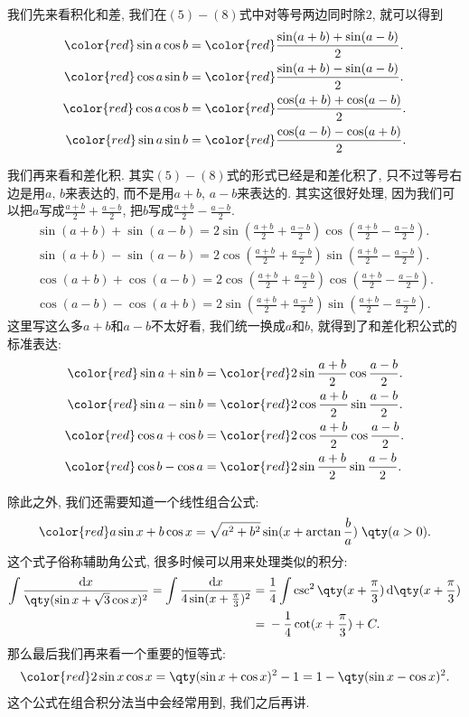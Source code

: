 \documentclass{ctexbook}
\newcommand*{\dif}{\mathop{}\!\mathrm{d}}
\begin{document}
{我们先来看积化和差, 我们在$(5)-(8)$式中对等号两边同时除$2$, 就可以得到
\begin{align*}\color{red}
\sin{a}\cos{b}={}&\color{red}\frac{\sin(a+b)+\sin(a-b)}{2}.\\\color{red}
\cos{a}\sin{b}={}&\color{red}\frac{\sin(a+b)-\sin(a-b)}{2}.\\\color{red}
\cos{a}\cos{b}={}&\color{red}\frac{\cos(a+b)+\cos(a-b)}{2}.\\\color{red}
\sin{a}\sin{b}={}&\color{red}\frac{\cos(a-b)-\cos(a+b)}{2}
.\end{align*}\par
我们再来看和差化积. 其实$(5)-(8)$式的形式已经是和差化积了, 只不过等号右边是用$a,\,b$来表达的, 而不是用$a+b,\,a-b$来表达的. 其实这很好处理, 因为我们可以把$a$写成$\frac{a+b}{2}+\frac{a-b}{2}$, 把$b$写成$\frac{a+b}{2}-\frac{a-b}{2}$. 
\begin{align*}
\sin(a+b)+\sin(a-b)=2\sin(\frac{a+b}{2}+\frac{a-b}{2})\cos(\frac{a+b}{2}-\frac{a-b}{2}).\\
\sin(a+b)-\sin(a-b)=2\cos(\frac{a+b}{2}+\frac{a-b}{2})\sin(\frac{a+b}{2}-\frac{a-b}{2}).\\
\cos(a+b)+\cos(a-b)=2\cos(\frac{a+b}{2}+\frac{a-b}{2})\cos(\frac{a+b}{2}-\frac{a-b}{2}).\\
\cos(a-b)-\cos(a+b)=2\sin(\frac{a+b}{2}+\frac{a-b}{2})\sin(\frac{a+b}{2}-\frac{a-b}{2})
.\end{align*}
这里写这么多$a+b$和$a-b$不太好看, 我们统一换成$a$和$b$, 就得到了和差化积公式的标准表达: 
\begin{align*}\color{red}
\sin{a}+\sin{b}={}&\color{red}2\sin{\frac{a+b}{2}}\cos{\frac{a-b}{2}}.\\\color{red}
\sin{a}-\sin{b}={}&\color{red}2\cos{\frac{a+b}{2}}\sin{\frac{a-b}{2}}.\\\color{red}
\cos{a}+\cos{b}={}&\color{red}2\cos{\frac{a+b}{2}}\cos{\frac{a-b}{2}}.\\\color{red}
\cos{b}-\cos{a}={}&\color{red}2\sin{\frac{a+b}{2}}\sin{\frac{a-b}{2}}
.\end{align*}\par
除此之外, 我们还需要知道一个线性组合公式: 
\begin{align*}\color{red}
a\sin{x}+b\cos{x}=\sqrt{a^{2}+b^{2}}\sin(x+\arctan{\frac{b}{a}})\;\qty(a>0)
.\end{align*}
这个式子俗称辅助角公式, 很多时候可以用来处理类似的积分: 
\begin{align*}
\int\frac{\dif{x}}{\qty(\sin{x}+\sqrt{3}\cos{x})^{2}}=\int\frac{\dif{x}}{4\sin(x+\frac{\pi}{3})^{2}}={}&\frac{1}{4}\int\csc^{2}\qty(x+\frac{\pi}{3})\dif{\qty(x+\frac{\pi}{3})}\\
={}&-\frac{1}{4}\cot(x+\frac{\pi}{3})+C
.\end{align*}
那么最后我们再来看一个重要的恒等式: 
\begin{align*}\color{red}
2\sin{x}\cos{x}=\qty(\sin{x}+\cos{x})^{2}-1=1-\qty(\sin{x}-\cos{x})^{2}
.\end{align*}
这个公式在组合积分法当中会经常用到, 我们之后再讲. \par
}
\end{document}
